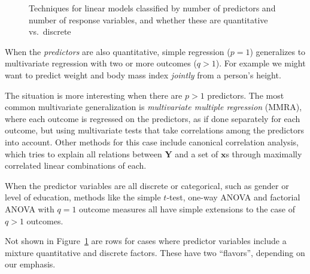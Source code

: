 \documentclass[
  letterpaper,
  10pt,
  krantz2]{krantz}
\begin{document}
\begin{figure}


\caption{\label{fig-techniques}Techniques for linear models classified
by number of predictors and number of response variables, and whether
these are quantitative vs.~discrete}

\end{figure}%

When the \emph{predictors} are also quantitative, simple regression
(\(p=1\)) generalizes to multivariate regression with two or more
outcomes (\(q > 1\)). For example we might want to predict weight and
body mass index \emph{jointly} from a person's height.

The situation is more interesting when there are \(p>1\) predictors. The
most common multivariate generalization is \emph{multivariate multiple
regression} (MMRA), where each outcome is regressed on the predictors,
as if done separately for each outcome, but using multivariate tests
that take correlations among the predictors into account. Other methods
for this case include canonical correlation analysis, which tries to
explain all relations between \(\mathbf{Y}\) and a set of
\(\mathbf{x}\)s through maximally correlated linear combinations of
each.

When the predictor variables are all discrete or categorical, such as
gender or level of education, methods like the simple \(t\)-test,
one-way ANOVA and factorial ANOVA with \(q=1\) outcome measures all have
simple extensions to the case of \(q>1\) outcomes.

Not shown in Figure~\ref{fig-techniques} are rows for cases where
predictor variables include a mixture quantitative and discrete factors.
These have two ``flavors'', depending on our emphasis.
\end{document}

